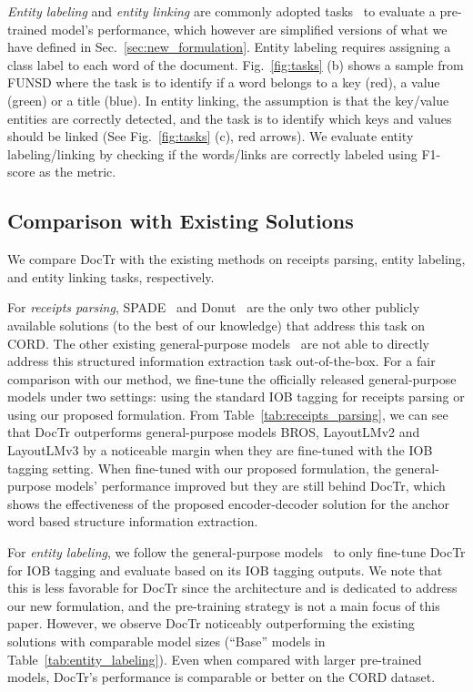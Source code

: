\textit{Entity labeling} and \textit{entity linking} are commonly adopted tasks~\cite{xu2020layoutlm,hwang2020spatial} to evaluate a pre-trained model's performance, which however are simplified versions of what we have defined in Sec.~\ref{sec:new_formulation}. Entity labeling requires assigning a class label to each word of the document. Fig.~\ref{fig:tasks} (b) shows a sample from FUNSD where the task is to identify if a word belongs to a key (red), a value (green) or a title (blue). In entity linking, the assumption is that the key/value entities are correctly detected, and the task is to identify which keys and values should be linked (See Fig.~\ref{fig:tasks} (c), red arrows). We evaluate entity labeling/linking by checking if the words/links are correctly labeled using F1-score as the metric.

\subsection{Comparison with Existing Solutions}

We compare DocTr with the existing methods on receipts parsing, entity labeling, and entity linking tasks, respectively.

For \textit{receipts parsing}, SPADE~\cite{hwang2020spatial} and Donut~\cite{kim2022ocr} are the only two other publicly available solutions (to the best of our knowledge) that address this task on CORD. The other existing general-purpose models~\cite{xu2021layoutlmv2,hong2021bros, huang2022layoutlmv3} are not able to directly address this structured information extraction task out-of-the-box. For a fair comparison with our method, we fine-tune the officially released general-purpose models under two settings: using the standard IOB tagging for receipts parsing or using our proposed formulation. From Table~\ref{tab:receipts_parsing}, we can see that DocTr outperforms general-purpose models BROS, LayoutLMv2 and LayoutLMv3 by a noticeable margin when they are fine-tuned with the IOB tagging setting. When fine-tuned with our proposed formulation, the general-purpose models' performance improved but they are still behind DocTr, which shows the effectiveness of the proposed encoder-decoder solution for the anchor word based structure information extraction.

For \textit{entity labeling}, we follow the general-purpose models~\cite{xu2020layoutlm} to only fine-tune DocTr for IOB tagging and evaluate based on its IOB tagging outputs. We note that this is less favorable for DocTr since the architecture and is dedicated to address our new formulation, and the pre-training strategy is not a main focus of this paper. However, we observe DocTr noticeably outperforming the existing solutions with comparable model sizes (``Base'' models in Table~\ref{tab:entity_labeling}). Even when compared with larger pre-trained models, DocTr's performance is comparable or better on the CORD dataset. 

